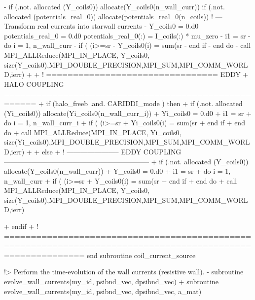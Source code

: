  
-    if (.not. allocated (Y_coils0)) allocate(Y_coils0(n_wall_curr))
     if (.not. allocated (potentials_real_0)) allocate(potentials_real_0(n_coils))
     ! --- Transform real currents into starwall currents
-    Y_coils0          = 0.d0
     potentials_real_0 = 0.d0
     potentials_real_0(:) = I_coils(:)  * mu_zero
-    i1 = sr%
-    do i = 1, n_wall_curr
-      if ( (i>=sr%
-        Y_coils0(i) = sum(sr%
-      end if
-    end do
-    call MPI_ALLReduce(MPI_IN_PLACE, Y_coils0, size(Y_coils0),MPI_DOUBLE_PRECISION,MPI_SUM,MPI_COMM_WORLD,ierr)
+    
+    ! ================================ EDDY + HALO COUPLING ====================================================
+    if (halo_freeb .and. CARIDDI_mode ) then
+      if (.not. allocated (Yi_coils0)) allocate(Yi_coils0(n_wall_curr_i))
+      Yi_coils0          = 0.d0
+      i1 = sr%
+      do i = 1, n_wall_curr_i
+        if ( (i>=sr%
+          Yi_coils0(i) = sum(sr%
+        end if
+      end do
+      call MPI_ALLReduce(MPI_IN_PLACE, Yi_coils0, size(Yi_coils0),MPI_DOUBLE_PRECISION,MPI_SUM,MPI_COMM_WORLD,ierr)
+    
+    else
+      ! ----------------------- EDDY COUPLING ---------------------------------------------------------------
+      if (.not. allocated (Y_coils0)) allocate(Y_coils0(n_wall_curr))
+      Y_coils0          = 0.d0
+      i1 = sr%
+      do i = 1, n_wall_curr
+        if ( (i>=sr%
+          Y_coils0(i) = sum(sr%
+        end if
+      end do
+      call MPI_ALLReduce(MPI_IN_PLACE, Y_coils0, size(Y_coils0),MPI_DOUBLE_PRECISION,MPI_SUM,MPI_COMM_WORLD,ierr)
 
+    endif
+    ! ===========================================================================================================
   end subroutine coil_current_source
   
   
   
   !> Perform the time-evolution of the wall currents (resistive wall).
-  subroutine evolve_wall_currents(my_id, psibnd_vec, dpsibnd_vec)
+  subroutine evolve_wall_currents(my_id, psibnd_vec, dpsibnd_vec, a_mat)
     
